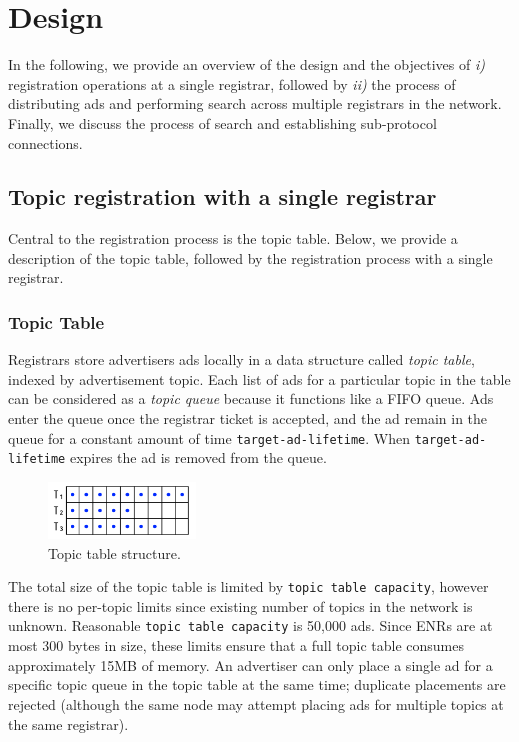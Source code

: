 
\section{Design}
\label{sec:design}

In the following, we provide an overview of the design and the objectives of \textit{i)} registration operations at a single registrar, followed by \textit{ii)} the process of distributing ads and performing search across multiple registrars in the network. Finally, we discuss the process of search and establishing sub-protocol connections. 

\subsection{Topic registration with a single registrar}

Central to the registration process is the topic table. 
Below, we provide a description of the topic table, followed by the registration process with a single registrar. 

\subsubsection{Topic Table}

Registrars store advertisers ads locally in a data structure called \emph{topic table}, 
indexed by advertisement topic. 
Each list of ads for a particular topic in the table  can be considered as a \emph{topic queue} because it functions like a FIFO queue.
Ads enter the queue once the registrar ticket is accepted,  and
the ad remain in the queue for a constant amount of time \texttt{target-ad-lifetime}. 
When \texttt{target-ad-lifetime} expires the ad is removed  from the queue.

\begin{figure}
    \includegraphics[width=0.35\textwidth]{img/topic-queue-diagram.png}
    \caption{Topic table structure.}
    \label{fig:topic_table}
 \end{figure}

The total size of the topic table is limited by \texttt{topic table capacity},  however there is no per-topic limits since existing number of topics in the network is unknown. 
Reasonable \texttt{topic table capacity} is 50,000 ads. 
Since ENRs are at most 300 bytes in size, these limits ensure that a full topic table consumes approximately 15MB of memory.
An advertiser can only place a single ad for a specific topic queue in the topic table at the same time; duplicate placements are rejected (although the same node may attempt placing ads for multiple topics at the same registrar).

